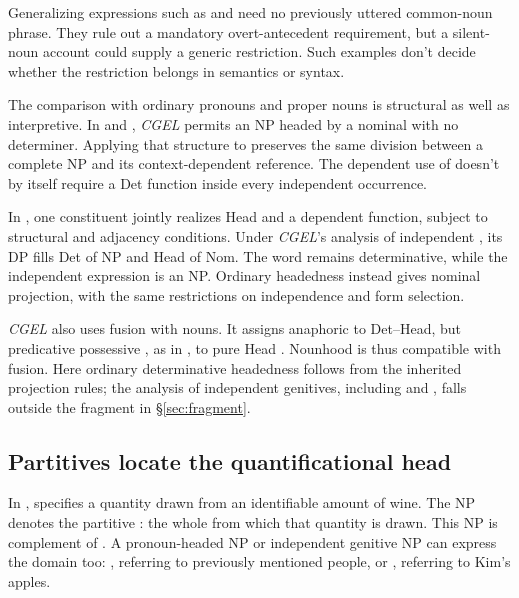 \documentclass[12pt]{article}
\begin{document}
Generalizing expressions such as  and  need no previously uttered common-noun phrase. They rule out a mandatory overt-antecedent requirement, but a silent-noun account could supply a generic restriction. Such examples don't decide whether the restriction belongs in semantics or syntax.

The comparison with ordinary pronouns and proper nouns is structural as well as interpretive. In  and , \textit{CGEL} permits an NP headed by a nominal with no determiner. Applying that structure to  preserves the same division between a complete NP and its context-dependent reference. The dependent use of  doesn't by itself require a Det function inside every independent occurrence.

In \textcite{Payne2007}, one constituent jointly realizes Head and a dependent function, subject to structural and adjacency conditions. Under \textit{CGEL}'s analysis of independent , its DP fills Det of NP and Head of Nom. The word remains determinative, while the independent expression is an NP. Ordinary headedness instead gives  nominal projection, with the same restrictions on independence and form selection.

\textit{CGEL} also uses fusion with nouns. It assigns anaphoric  to Det--Head, but predicative possessive , as in , to pure Head \citep[410--411]{huddleston2002}. Nounhood is thus compatible with fusion. Here ordinary determinative headedness follows from the inherited projection rules; the analysis of independent genitives, including  and , falls outside the fragment in §\ref{sec:fragment}.

\subsection{Partitives locate the quantificational head}

In ,  specifies a quantity drawn from an identifiable amount of wine. The NP  denotes the partitive : the whole from which that quantity is drawn. This NP is complement of . A pronoun-headed NP or independent genitive NP can express the domain too: , referring to previously mentioned people, or , referring to Kim's apples.
\end{document}
